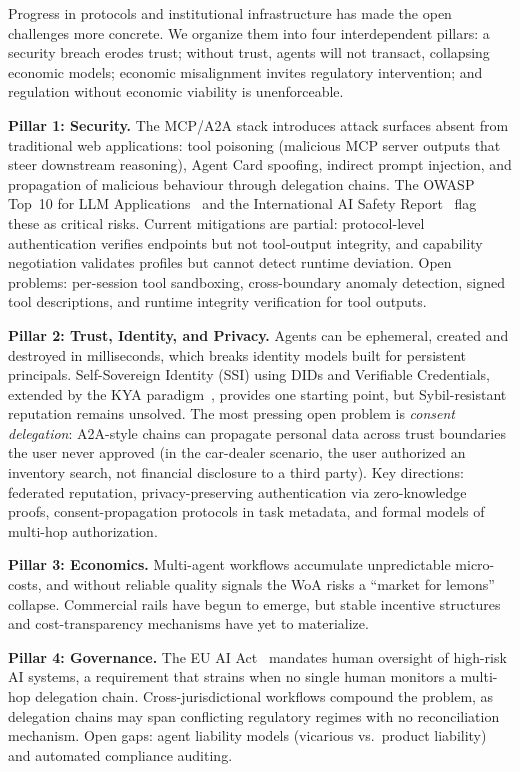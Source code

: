 \documentclass[10pt,twocolumn]{article}
\begin{document}
Progress in protocols and institutional infrastructure has made the open challenges more concrete. We organize them into four interdependent pillars: a security breach erodes trust; without trust, agents will not transact, collapsing economic models; economic misalignment invites regulatory intervention; and regulation without economic viability is unenforceable.

\textbf{Pillar 1: Security.}  The MCP/A2A stack introduces attack surfaces absent from traditional web applications: tool poisoning (malicious MCP server outputs that steer downstream reasoning), Agent Card spoofing, indirect prompt injection, and propagation of malicious behaviour through delegation chains.  The OWASP Top~10 for LLM Applications~\cite{OWASP_LLM_2025} and the International AI Safety Report~\cite{AISAFETY_2025} flag these as critical risks.  Current mitigations are partial: protocol-level authentication verifies endpoints but not tool-output integrity, and capability negotiation validates profiles but cannot detect runtime deviation.  Open problems: per-session tool sandboxing, cross-boundary anomaly detection, signed tool descriptions, and runtime integrity verification for tool outputs.

\textbf{Pillar 2: Trust, Identity, and Privacy.}  Agents can be ephemeral, created and destroyed in milliseconds, which breaks identity models built for persistent principals.  Self-Sovereign Identity (SSI) using DIDs and Verifiable Credentials, extended by the KYA paradigm~\cite{KYA_Paradigm_2025}, provides one starting point, but Sybil-resistant reputation remains unsolved.  The most pressing open problem is \emph{consent delegation}: A2A-style chains can propagate personal data across trust boundaries the user never approved (in the car-dealer scenario, the user authorized an inventory search, not financial disclosure to a third party).  Key directions: federated reputation, privacy-preserving authentication via zero-knowledge proofs, consent-propagation protocols in task metadata, and formal models of multi-hop authorization.

\textbf{Pillar 3: Economics.}  Multi-agent workflows accumulate unpredictable micro-costs, and without reliable quality signals the WoA risks a ``market for lemons'' collapse.  Commercial rails have begun to emerge, but stable incentive structures and cost-transparency mechanisms have yet to materialize.

\textbf{Pillar 4: Governance.}  The EU AI Act~\cite{EUAI_2024} mandates human oversight of high-risk AI systems, a requirement that strains when no single human monitors a multi-hop delegation chain.  Cross-jurisdictional workflows compound the problem, as delegation chains may span conflicting regulatory regimes with no reconciliation mechanism.  Open gaps: agent liability models (vicarious vs.\ product liability) and automated compliance auditing.
\end{document}
